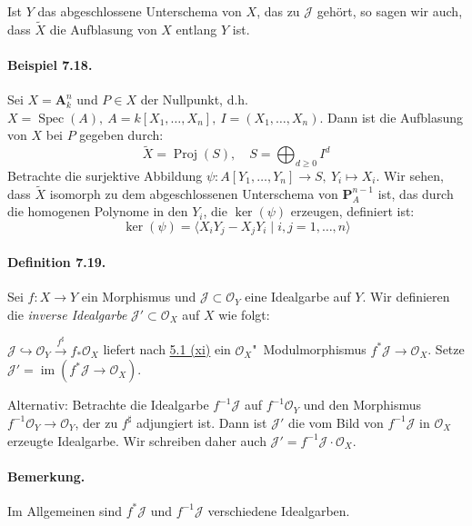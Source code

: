 \documentclass[11pt,b5paper,openany]{memoir}
\begin{document}
Ist $Y$ das abgeschlossene Unterschema von $X$, das zu $\mathcal{J}$ gehört, so sagen wir auch, dass $\widetilde{X}$ die Aufblasung von $X$ entlang $Y$ ist.

\paragraph{Beispiel 7.18.}\label{7.18} Sei $X=\mathbf{A}^n_k$ und $P\in X$ der Nullpunkt, d.h. $X=\operatorname{Spec}(A),\ A=k[X_1,\ldots,X_n],\ I=(X_1,\ldots,X_n)$. Dann ist die Aufblasung von $X$ bei $P$ gegeben durch:
\[\widetilde{X}=\operatorname{Proj}(S),\quad S=\bigoplus_{d\geq 0}I^d\]
Betrachte die surjektive Abbildung $\psi:A[Y_1,\ldots,Y_n]\to S,\ Y_i\mapsto X_i$. Wir sehen, dass $\widetilde{X}$ isomorph zu dem abgeschlossenen Unterschema von $\mathbf{P}_A^{n-1}$ ist, das durch die homogenen Polynome in den $Y_i$, die $\ker(\psi)$ erzeugen, definiert ist:
\[\ker(\psi)=\langle X_iY_j-X_jY_i\mid i,j=1,\ldots,n\rangle\]

\paragraph{Definition 7.19.}\label{7.19} Sei $f:X\to Y$ ein Morphismus und $\mathcal{J}\subset\mathcal{O}_Y$ eine Idealgarbe auf $Y$. Wir definieren die \textit{inverse Idealgarbe} $\mathcal{J}'\subset\mathcal{O}_X$ auf $X$ wie folgt:

$\mathcal{J}\hookrightarrow\mathcal{O}_Y\stackrel{f^\sharp}{\to}f_\ast\mathcal{O}_X$ liefert nach \hyperref[5.1]{5.1 (xi)} ein $\mathcal{O}_X$"~Modulmorphismus $f^\ast\mathcal{J}\to\mathcal{O}_X$. Setze $\mathcal{J}'=\operatorname{im}(f^\ast\mathcal{J}\to\mathcal{O}_X)$.

Alternativ: Betrachte die Idealgarbe $f^{-1}\mathcal{J}$ auf $f^{-1}\mathcal{O}_Y$ und den Morphismus $f^{-1}\mathcal{O}_Y\to \mathcal{O}_Y$, der zu $f^\sharp$ adjungiert ist. Dann ist $\mathcal{J}'$ die vom Bild von $f^{-1}\mathcal{J}$ in $\mathcal{O}_X$ erzeugte Idealgarbe. Wir schreiben daher auch $\mathcal{J}'=f^{-1}\mathcal{J}\cdot\mathcal{O}_X$.

\paragraph{Bemerkung.} Im Allgemeinen sind $f^\ast\mathcal{J}$ und $f^{-1}\mathcal{J}$ verschiedene Idealgarben.
\end{document}
